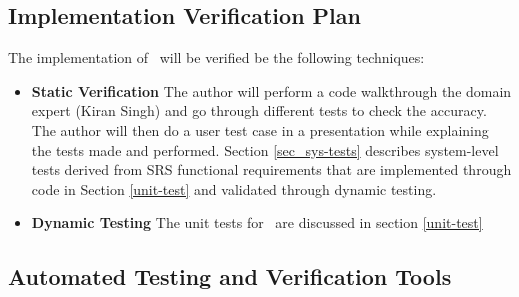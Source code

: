 \documentclass[12pt, titlepage]{article}
\begin{document}



\subsection{Implementation Verification Plan}\label{plan_implement}

The implementation of \progname~will be verified be the following techniques:
\begin{itemize}
  \item \textbf{Static Verification}
  \newline  
    The author will perform a code walkthrough the domain expert (Kiran Singh) and go through different tests to check the accuracy. The author will then do a user test case in a presentation while explaining the tests made and performed. Section \ref{sec_sys-tests} describes system-level tests derived from SRS functional requirements that are implemented through code in Section \ref{unit-test} and validated through dynamic testing.

  \item \textbf{Dynamic Testing}
  \newline
  The unit tests for \progname~are discussed in section \ref{unit-test} 

\end{itemize}




\subsection{Automated Testing and Verification Tools}\label{plan_auto}
\end{document}
